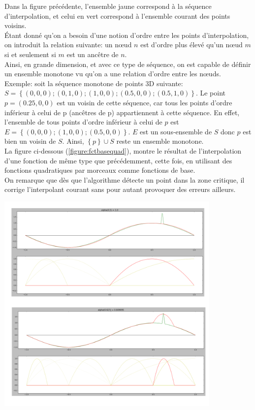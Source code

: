 Dans la figure précédente, l'ensemble jaune correspond à la séquence d'interpolation, et celui en vert correspond à l'ensemble courant des points voisins.\\
Étant donné qu'on a besoin d'une notion d'ordre entre les points d'interpolation, on introduit la relation suivante: un nœud $n$ est d'ordre plus élevé qu'un nœud $m$ si et seulement si $m$ est un ancêtre de $n$.\\
Ainsi, en grande dimension, et avec ce type de séquence, on est capable de définir un ensemble monotone vu qu'on a une relation d'ordre entre les nœuds.\\
Exemple: soit la séquence monotone de points 3D suivante:\\
$S = \left \{ (0,0,0); (0,1,0); (1,0,0); (0.5,0,0); (0.5,1,0) \right \}$. Le point $p = (0.25,0,0)$ est un voisin de cette séquence, car tous les points d'ordre inférieur à celui de p (ancêtres de p) appartiennent à cette séquence. En effet, l'ensemble de tous points d'ordre inférieur à celui de $p$ est $E = \left \{(0,0,0); (1,0,0); (0.5,0,0)\right \}$. $E$ est un sous-ensemble de $S$ donc $p$ est bien un voisin de $S$. Ainsi, $\left \{p \right \} \cup S$ reste un ensemble monotone.\\
La figure ci-dessous (\ref{figure:fctbasequad}), montre le résultat de l'interpolation d'une fonction de même type que précédemment, cette fois, en utilisant des fonctions quadratiques par morceaux comme fonctions de base.\\
On remarque que dès que l'algorithme détecte un point dans la zone critique, il corrige l'interpolant courant sans pour autant provoquer des erreurs ailleurs.\\
\begin{center}
\includegraphics[height= 11cm,width = 11cm]{images/interp_pm.png}
\label{figure:fctbasequad}
\end{center}

